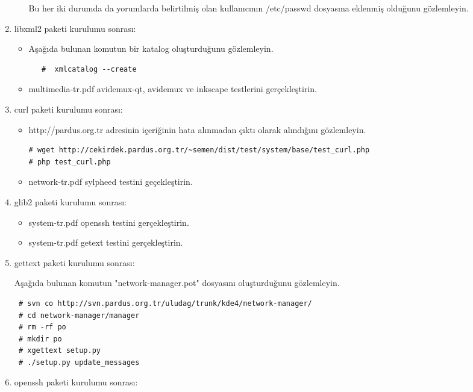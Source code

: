 \documentclass[a4paper,10pt]{article}
\begin{document}
\begin{enumerate}
\begin{itemize}
   Bu her iki durumda da yorumlarda belirtilmiş olan kullanıcının /etc/passwd dosyasına eklenmiş olduğunu gözlemleyin.

\end{itemize}
\item libxml2 paketi kurulumu sonrası:

\begin{itemize}
\item Aşağıda bulunan komutun bir katalog oluşturduğunu gözlemleyin.
  \begin{verbatim}
   #  xmlcatalog --create
  \end{verbatim}
\item multimedia-tr.pdf avidemux-qt, avidemux ve inkscape testlerini gerçekleştirin.
\end{itemize}
\item curl paketi kurulumu sonrası:

\begin{itemize}
\item http://pardus.org.tr adresinin içeriğinin hata alınmadan çıktı olarak alındığını gözlemleyin.
\begin{verbatim}
# wget http://cekirdek.pardus.org.tr/~semen/dist/test/system/base/test_curl.php
# php test_curl.php
\end{verbatim}

\item network-tr.pdf sylpheed testini geçekleştirin.
\end{itemize}

\item glib2 paketi kurulumu sonrası:
\begin{itemize}
 \item system-tr.pdf openssh testini gerçekleştirin.
\item system-tr.pdf getext testini gerçekleştirin.
\end{itemize}

\item gettext paketi kurulumu sonrası:

Aşağıda bulunan komutun "network-manager.pot" dosyasını oluşturduğunu gözlemleyin.
\begin{verbatim}
 # svn co http://svn.pardus.org.tr/uludag/trunk/kde4/network-manager/
 # cd network-manager/manager
 # rm -rf po
 # mkdir po
 # xgettext setup.py 
 # ./setup.py update_messages
\end{verbatim}


\item openssh paketi kurulumu sonrası:


\end{enumerate}
\end{document}
